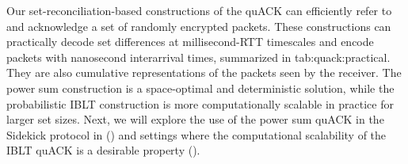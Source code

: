 Our set-reconciliation-based constructions of the quACK can efficiently refer to
and acknowledge a set of randomly encrypted packets. These constructions can
practically decode set differences at millisecond-RTT timescales and encode
packets with nanosecond interarrival times, summarized in \Cref
{tab:quack:practical}. They are also cumulative representations of the packets
seen by the receiver. The power sum construction is a space-optimal and
deterministic solution, while the probabilistic IBLT construction is more
computationally scalable in practice for larger set sizes. Next, we will explore
the use of the power sum quACK in the Sidekick protocol in ()
and settings where the computational scalability of the IBLT quACK is a
desirable property ().


